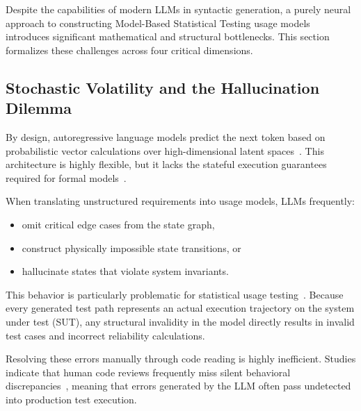\label{sec:bottlenecks}

Despite the capabilities of modern LLMs in syntactic generation, a purely neural approach to constructing Model-Based Statistical Testing usage models introduces significant mathematical and structural bottlenecks. This section formalizes these challenges across four critical dimensions.



\subsection{Stochastic Volatility and the Hallucination Dilemma}
\label{subsec:hallucination}

By design, autoregressive language models predict the next token based on probabilistic vector calculations over high-dimensional latent spaces~\cite{vaswani2017attention}. This architecture is highly flexible, but it lacks the stateful execution guarantees required for formal models~\cite{llm_state_machine_frameworks}.

When translating unstructured requirements into usage models, LLMs frequently:
\begin{itemize}
    \item omit critical edge cases from the state graph,
    \item construct physically impossible state transitions, or
    \item hallucinate states that violate system invariants.
\end{itemize}

This behavior is particularly problematic for statistical usage testing~\cite{taxonomy_mbt}. Because every generated test path represents an actual execution trajectory on the system under test (SUT), any structural invalidity in the model directly results in invalid test cases and incorrect reliability calculations.

Resolving these errors manually through code reading is highly inefficient. Studies indicate that human code reviews frequently miss silent behavioral discrepancies~\cite{kang2023llm}, meaning that errors generated by the LLM often pass undetected into production test execution.



